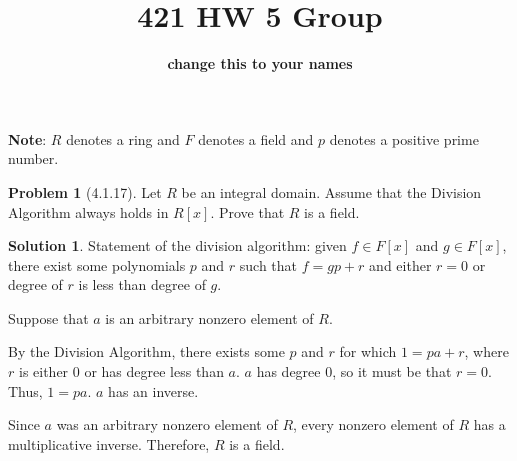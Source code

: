 \documentclass[12pt]{article}
\theoremstyle{definition}
\newtheorem*{prob}{Problem}
\newtheorem*{soln}{Solution}
\newcommand{\ZZ}{{\mathbb{Z}}}
\newcommand{\QQ}{{\mathbb{Q}}}
\begin{document}
%
\title{421 HW 5 Group}
\author{\textbf{change this to your names}}

\date{}

\maketitle

\textbf{Note}: $R$ denotes a ring and $F$ denotes a field and $p$ denotes a positive
prime number.

%
%
%



%
%


\begin{prob}[4.1.17]
Let $R$ be an integral domain. 
Assume that the Division Algorithm always holds in $R[x]$. Prove that $R$ is a field.
\end{prob}

\begin{soln}

Statement of the division algorithm:
given $f\in F[x]$ and $g\in F[x]$, there exist some polynomials $p$ and $r$
such that $f=gp+r$ and either $r=0$ or degree of $r$ is less than degree of $g$.

Suppose that $a$ is an arbitrary nonzero element of $R$.

By the Division Algorithm,
there exists some $p$ and $r$ for which $1=pa+r$,
where $r$ is either $0$ or has degree less than $a$.
$a$ has degree $0$, so it must be that $r=0$.
Thus, $1=pa$.
$a$ has an inverse.

Since $a$ was an arbitrary nonzero element of $R$,
every nonzero element of $R$ has a multiplicative inverse.
Therefore, $R$ is a field.

\end{soln}
\end{document}
